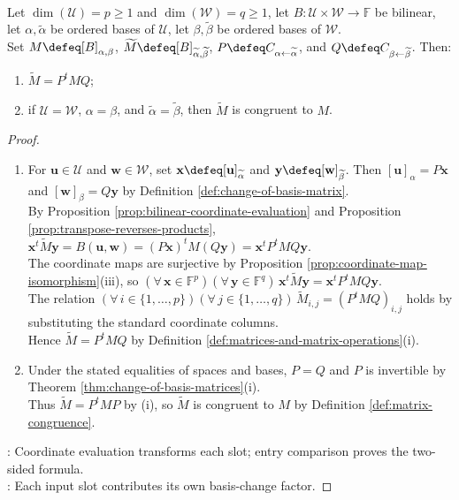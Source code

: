 \begin{proposition} \label{prop:bilinear-pairing-change-of-bases} \\
Let $\dim(\mathcal{U})=p\geq1$ and $\dim(\mathcal{W})=q\geq1$, let $B:\mathcal{U}\times\mathcal{W}\to\mathbb{F}$ be bilinear, let $\alpha,\widetilde{\alpha}$ be ordered bases of $\mathcal{U}$, let $\beta,\widetilde{\beta}$ be ordered bases of $\mathcal{W}$.\\
Set $M\defeq[B]_{\alpha,\beta}$, $\widetilde{M}\defeq[B]_{\widetilde{\alpha},\widetilde{\beta}}$, $P\defeq C_{\alpha\leftarrow\widetilde{\alpha}}$, and $Q\defeq C_{\beta\leftarrow\widetilde{\beta}}$. Then:
\begin{enumerate}[label=(\roman*)]
\setlength{\itemsep}{0pt}
\item $\widetilde{M}=P^tMQ$;
\item if $\mathcal{U}=\mathcal{W}$, $\alpha=\beta$, and $\widetilde{\alpha}=\widetilde{\beta}$, then $\widetilde{M}$ is congruent to $M$.
\end{enumerate}
\begin{proof}
\begin{enumerate}[label=(\roman*)]
\setlength{\itemsep}{0pt}
\item For $\mathbf{u}\in\mathcal{U}$ and $\mathbf{w}\in\mathcal{W}$, set $\mathbf{x}\defeq[\mathbf{u}]_{\widetilde{\alpha}}$ and $\mathbf{y}\defeq[\mathbf{w}]_{\widetilde{\beta}}$. Then $[\mathbf{u}]_{\alpha}=P\mathbf{x}$ and $[\mathbf{w}]_{\beta}=Q\mathbf{y}$ by Definition \ref{def:change-of-basis-matrix}.\\
By Proposition \ref{prop:bilinear-coordinate-evaluation} and Proposition \ref{prop:transpose-reverses-products}, $\mathbf{x}^t\widetilde{M}\mathbf{y}=B(\mathbf{u},\mathbf{w})=(P\mathbf{x})^tM(Q\mathbf{y})=\mathbf{x}^tP^tMQ\mathbf{y}$.\\
The coordinate maps are surjective by Proposition \ref{prop:coordinate-map-isomorphism}(iii), so $(\forall\,\mathbf{x}\in\mathbb{F}^p)(\forall\,\mathbf{y}\in\mathbb{F}^q)\,\mathbf{x}^t\widetilde{M}\mathbf{y}=\mathbf{x}^tP^tMQ\mathbf{y}$.\\
The relation $(\forall\,i\in\{1,\ldots,p\})(\forall\,j\in\{1,\ldots,q\})\,\widetilde{M}_{i,j}=(P^tMQ)_{i,j}$ holds by substituting the standard coordinate columns.\\
Hence $\widetilde{M}=P^tMQ$ by Definition \ref{def:matrices-and-matrix-operations}(i).
\item Under the stated equalities of spaces and bases, $P=Q$ and $P$ is invertible by Theorem \ref{thm:change-of-basis-matrices}(i).\\
Thus $\widetilde{M}=P^tMP$ by (i), so $\widetilde{M}$ is congruent to $M$ by Definition \ref{def:matrix-congruence}.
\end{enumerate}
: Coordinate evaluation transforms each slot; entry comparison proves the two-sided formula.\\
: Each input slot contributes its own basis-change factor.
\end{proof}
\end{proposition}

